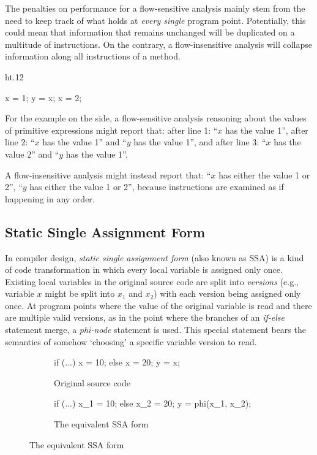 The penalties on performance for a flow-sensitive analysis mainly stem from the need to keep track of what holds at \emph{every single} program point. Potentially, this could mean that information that remains unchanged will be duplicated on a multitude of instructions. On the contrary, a flow-insensitive analysis will collapse information along all instructions of a method.

{
\setlength\intextsep{-10pt}
\begin{wrapfigure}{ht}{.12\textwidth}
\centering
\begin{javacodeLines}
x = 1;
y = x;
x = 2;
\end{javacodeLines}
\end{wrapfigure}

For the example on the side, a flow-sensitive analysis reasoning about the values of primitive expressions might report that:
after line 1: ``$x$ has the value 1'',
after line 2: ``$x$ has the value 1'' and ``$y$ has the value 1'', and
after line 3: ``$x$ has the value 2'' and ``$y$ has the value 1''.

A flow-insensitive analysis might instead report that:
``$x$ has either the value 1 or 2'', ``$y$ has either the value 1 or 2'',
because instructions are examined as if happening in any order.
}

\subsection{Static Single Assignment Form}

In compiler design, \emph{static single assignment form} (also known as SSA) is a kind of code transformation in which every local variable is assigned only once. Existing local variables in the original source code are split into \emph{versions} (e.g., variable $x$ might be split into $x_1$ and $x_2$) with each version being assigned only once. At program points where the value of the original variable is read and there are multiple valid versions, as in the point where the branches of an \emph{if-else} statement merge, a \emph{phi-node} statement is used. This special statement bears the semantics of somehow `choosing' a specific variable version to read.

\begin{figure}[h]
\begin{subfigure}{.45\textwidth}
\begin{javacodeLines}
if (...) x = 10;
else x = 20;
y = x;
\end{javacodeLines}
\caption{Original source code}
\end{subfigure}%
    \hfill
\begin{subfigure}{.45\textwidth}
\begin{javacodeLines}
if (...) x_1 = 10;
else x_2 = 20;
y = phi(x_1, x_2);
\end{javacodeLines}
\caption{The equivalent SSA form}
\end{subfigure}
\end{figure}

